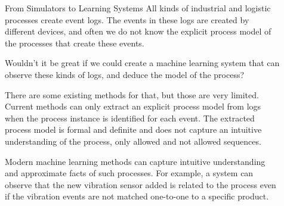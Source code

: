 \documentclass[final]{beamer}
\newlength{\sepwid}
\newlength{\threecolwid}
\begin{document}
\begin{frame}[t]
\begin{columns}[t]
\end{columns}

\begin{columns}[t]

\begin{column}{\sepwid}\end{column} %

\begin{column}{\threecolwid}

\begin{block}{From Simulators to Learning Systems}
All kinds of industrial and logistic processes create event logs. The events in these logs are created by different devices, and often we do not know
the explicit process model of the processes that create these events.

Wouldn't it be great if we could create a machine learning system that can observe these kinds of logs, and deduce the model of the process?

There are some existing methods for that, but those are very limited. Current methods can only extract an explicit process model
from logs when the process instance is identified for each event. The extracted process model is formal and definite and does not capture
an intuitive understanding of the process, only allowed and not allowed sequences.

Modern machine learning methods can capture intuitive understanding and approximate facts of such processes. For example, a system can observe that the new vibration sensor added is related to the process
even if the vibration events are not matched one-to-one to a specific product.
\end{block}



\end{column}


\begin{column}{\sepwid}\end{column} %

\end{columns}
\end{frame}


%
\end{document}
